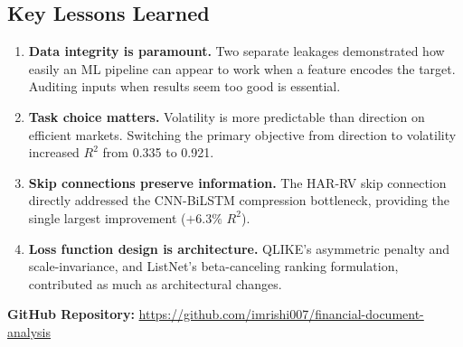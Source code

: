 \subsection{Key Lessons Learned}
\begin{enumerate}
    \item \textbf{Data integrity is paramount.} Two separate leakages demonstrated how easily an ML pipeline can appear to work when a feature encodes the target. Auditing inputs when results seem too good is essential.
    \item \textbf{Task choice matters.} Volatility is more predictable than direction on efficient markets. Switching the primary objective from direction to volatility increased $R^2$ from 0.335 to 0.921.
    \item \textbf{Skip connections preserve information.} The HAR-RV skip connection directly addressed the CNN-BiLSTM compression bottleneck, providing the single largest improvement ($+6.3\%$ $R^2$).
    \item \textbf{Loss function design is architecture.} QLIKE's asymmetric penalty and scale-invariance, and ListNet's beta-canceling ranking formulation, contributed as much as architectural changes.
\end{enumerate}

\vspace{1cm}
\noindent\textbf{GitHub Repository:} \url{https://github.com/imrishi007/financial-document-analysis}
